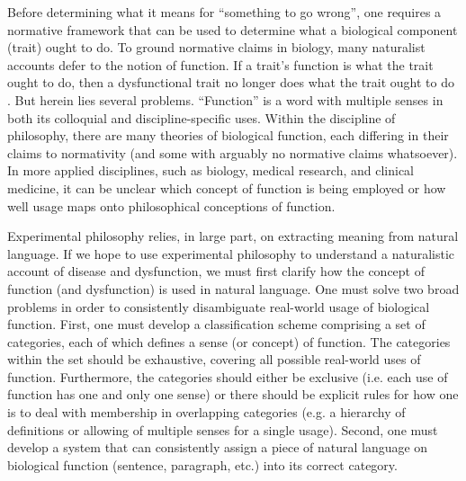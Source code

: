 \documentclass{article}
\begin{document}
Before determining what it means for ``something to go wrong'', one requires a normative framework that can be used to determine what a biological component (trait) ought to do.
To ground normative claims in biology, many naturalist accounts defer to the notion of function.
If a trait's function is what the trait ought to do, then a dysfunctional trait no longer does what the trait ought to do \cite{neander1995}.
But herein lies several problems.
``Function'' is a word with multiple senses in both its colloquial and discipline-specific uses.
Within the discipline of philosophy, there are many theories of biological function, each differing in their claims to normativity (and some with arguably no normative claims whatsoever).
In more applied disciplines, such as biology, medical research, and clinical medicine, it can be unclear which concept of function is being employed or how well usage maps onto philosophical conceptions of function.

Experimental philosophy relies, in large part, on extracting meaning from natural language.
If we hope to use experimental philosophy to understand a naturalistic account of disease and dysfunction, we must first clarify how the concept of function (and dysfunction) is used in natural language.
One must solve two broad problems in order to consistently disambiguate real-world usage of biological function.
First, one must develop a classification scheme comprising a set of categories, each of which defines a sense (or concept) of function.
The categories within the set should be exhaustive, covering all possible real-world uses of function.
Furthermore, the categories should either be exclusive (i.e. each use of function has one and only one sense) or there should be explicit rules for how one is to deal with membership in overlapping categories (e.g. a hierarchy of definitions or allowing of multiple senses for a single usage). 
Second, one must develop a system that can consistently assign a piece of natural language on biological function (sentence, paragraph, etc.) into its correct category.
\end{document}
